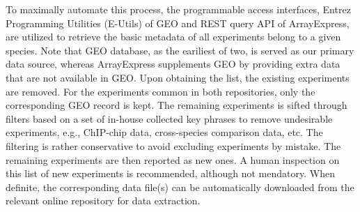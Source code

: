 To maximally automate this process, the programmable access interfaces,
Entrez Programming Utilities (E-Utils) of GEO and REST query API of
ArrayExpress, are utilized to retrieve the basic metadata of all
experiments belong to a given species.
%
Note that GEO database, as the eariliest of two, is served as our primary
data source, whereas ArrayExpress supplements GEO by providing extra data
that are not available in GEO.
%
Upon obtaining the list, the existing experiments are removed.  For the
experiments common in both repositories, only the corresponding GEO record
is kept.
%
The remaining experiments is sifted through filters based on a set of
in-house collected key phrases to remove undesirable experiments, e.g.,
ChIP-chip data, cross-species comparison data, etc.
%
The filtering is rather conservative to avoid excluding experiments by
mistake.
%
The remaining experiments are then reported as new ones.  A human
inspection on this list of new experiments is recommended, although
not mendatory. 
%
When definite, the corresponding data file(s) can be automatically
downloaded from the relevant online repository for data extraction.




